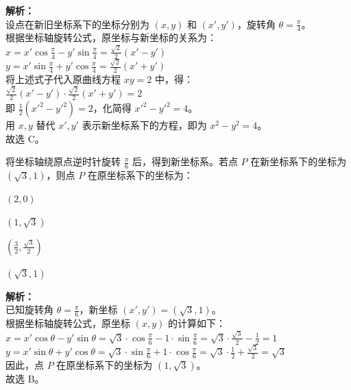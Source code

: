 \documentclass[12pt,a4paper]{exam-zh}
\begin{document}
\begin{solution}
    \textbf{解析：} \\
    设点在新旧坐标系下的坐标分别为 $(x, y)$ 和 $(x', y')$，旋转角 $\theta = \frac{\pi}{4}$。 \\
    根据坐标轴旋转公式，原坐标与新坐标的关系为： \\
    $x = x' \cos\frac{\pi}{4} - y' \sin\frac{\pi}{4} = \frac{\sqrt{2}}{2}(x' - y')$ \\
    $y = x' \sin\frac{\pi}{4} + y' \cos\frac{\pi}{4} = \frac{\sqrt{2}}{2}(x' + y')$ \\
    将上述式子代入原曲线方程 $xy = 2$ 中，得： \\
    $\frac{\sqrt{2}}{2}(x' - y') \cdot \frac{\sqrt{2}}{2}(x' + y') = 2$ \\
    即 $\frac{1}{2}(x'^2 - y'^2) = 2$，化简得 $x'^2 - y'^2 = 4$。 \\
    用 $x, y$ 替代 $x', y'$ 表示新坐标系下的方程，即为 $x^2 - y^2 = 4$。 \\
    故选 C。
\end{solution}

\begin{question}
    将坐标轴绕原点逆时针旋转 $\frac{\pi}{6}$ 后，得到新坐标系。若点 $P$ 在新坐标系下的坐标为 $(\sqrt{3}, 1)$，则点 $P$ 在原坐标系下的坐标为： \paren[B]
    \begin{choices}
        \item $(2, 0)$ \item $(1, \sqrt{3})$ \item $(\frac{3}{2}, \frac{\sqrt{3}}{2})$ \item $(\sqrt{3}, 1)$
    \end{choices}
\end{question}

\begin{solution}
    \textbf{解析：} \\
    已知旋转角 $\theta = \frac{\pi}{6}$，新坐标 $(x', y') = (\sqrt{3}, 1)$。 \\
    根据坐标轴旋转公式，原坐标 $(x, y)$ 的计算如下： \\
    $x = x' \cos\theta - y' \sin\theta = \sqrt{3} \cdot \cos\frac{\pi}{6} - 1 \cdot \sin\frac{\pi}{6} = \sqrt{3} \cdot \frac{\sqrt{3}}{2} - \frac{1}{2} = 1$ \\
    $y = x' \sin\theta + y' \cos\theta = \sqrt{3} \cdot \sin\frac{\pi}{6} + 1 \cdot \cos\frac{\pi}{6} = \sqrt{3} \cdot \frac{1}{2} + \frac{\sqrt{3}}{2} = \sqrt{3}$ \\
    因此，点 $P$ 在原坐标系下的坐标为 $(1, \sqrt{3})$。 \\
    故选 B。
\end{solution}
\end{document}
